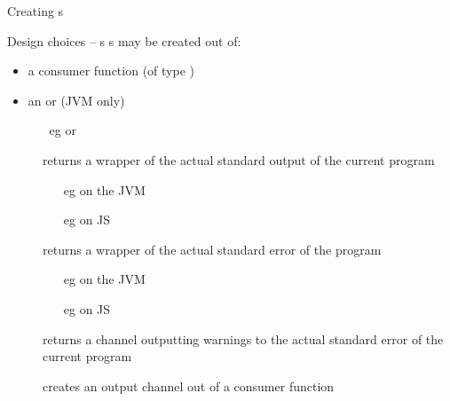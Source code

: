 \documentclass[handout]{beamer}
\begin{document}
\begin{frame}[allowframebreaks]{Creating s}
    \begin{block}{Design choices -- s}
        s may be created out of:
        \begin{itemize}
            \item a \alert{consumer} function (of type \alert{})
            \item an  or  (JVM only)
            \begin{itemize}
                \item[eg]  or 
            \end{itemize}
        \end{itemize}
    \end{block}
    \begin{description}
        \item[] returns a wrapper of the actual standard output of the current program
        \begin{itemize}\small
            \item[eg]  on the JVM
            \item[eg]  on JS
        \end{itemize}
        \item[] returns a wrapper of the actual standard error of the program
        \begin{itemize}\small
            \item[eg]  on the JVM
            \item[eg]  on JS
        \end{itemize}
        \item[] returns a channel outputting warnings to the actual standard error of the current program
        \item[] creates an output channel out of a consumer function
    \end{description}

\end{frame}
\end{document}
